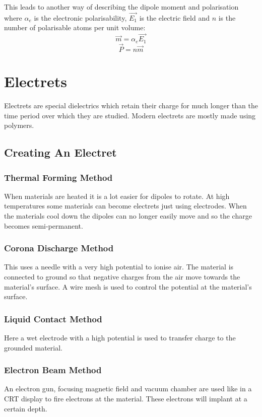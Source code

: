 \documentclass[11pt,a4paper]{report}
\begin{document}
This leads to another way of describing the dipole moment and polarisation where $\alpha_e$ is the electronic polarisability, $\vec{E_1}$ is the electric field and $n$ is the number of polarisable atoms per unit volume:
\begin{equation*}
	\vec{m}=\alpha_e\vec{E_1}
\end{equation*}
\begin{equation*}
	\vec{P} = n\vec{m}
\end{equation*}

\section{Electrets}
Electrets are special dielectrics which retain their charge for much longer than the time period over which they are studied. Modern electrets are mostly made using polymers. 

\subsection{Creating An Electret}
\subsubsection{Thermal Forming Method}
When materials are heated it is a lot easier for dipoles to rotate. At high temperatures some materials can become electrets just using electrodes. When the materials cool down the dipoles can no longer easily move and so the charge becomes semi-permanent. 

\subsubsection{Corona Discharge Method}
This uses a needle with a very high potential to ionise air. The material is connected to ground so that negative charges from the air move towards the material's surface. A wire mesh is used to control the potential at the material's surface. 

\subsubsection{Liquid Contact Method}
Here a wet electrode with a high potential is used to transfer charge to the grounded material.

\subsubsection{Electron Beam Method}
An electron gun, focusing magnetic field and vacuum chamber are used like in a CRT display to fire electrons at the material. These electrons will implant at a certain depth. 
\end{document}
